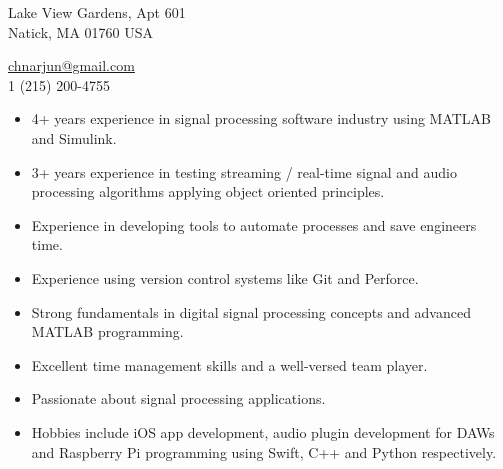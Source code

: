 \documentclass[12pt,a4paper]{article} %
\begin{document}
 


\begin{multicols}{2}

\begin{flushright}
 Lake View Gardens, Apt 601\\ Natick, MA 01760 USA %

\noindent\href{mailto:chnarjun@gmail.com}{chnarjun@gmail.com}\\%
\textsmaller{+}1 (215) 200-4755
\end{flushright}
\end{multicols}
\spacedhrule{0.9em}{-0.4em} %




\begin{itemize}
\item 4+ years experience in signal processing software industry using MATLAB and Simulink.
\noindent\item 3+ years experience in testing streaming / real-time signal and audio processing algorithms applying object oriented principles.
\noindent\item Experience in developing tools to automate processes and save engineers time.
\noindent\item Experience using version control systems like Git and Perforce.
\noindent\item Strong fundamentals in digital signal processing concepts and advanced MATLAB programming.
\noindent\item Excellent time management skills and a well-versed team player.
\noindent\item Passionate about signal processing applications.
\noindent\item Hobbies include iOS app development, audio plugin development for DAWs and Raspberry Pi programming using Swift, C++ and Python respectively.

\end{itemize}
\end{document}
